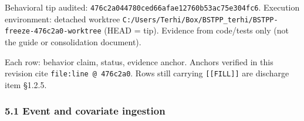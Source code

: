 \documentclass[
  10pt,
]{article}
\begin{document}
Behavioral tip audited: \texttt{476c2a044780ced66afae12760b53ac75e304fc6}.
Execution environment: detached worktree
\texttt{C:/Users/Terhi/Box/BSTPP\_terhi/BSTPP-freeze-476c2a0-worktree} (HEAD = tip).
Evidence from code/tests only (not the guide or consolidation document).

Each row: behavior claim, status, evidence anchor. Anchors verified in this revision cite \texttt{file:line\ @\ 476c2a0}. Rows still carrying \texttt{{[}{[}FILL{]}{]}} are discharge item §1.2.5.

\hypertarget{event-and-covariate-ingestion}{%
\subsubsection{5.1 Event and covariate ingestion}\label{event-and-covariate-ingestion}}
\end{document}
